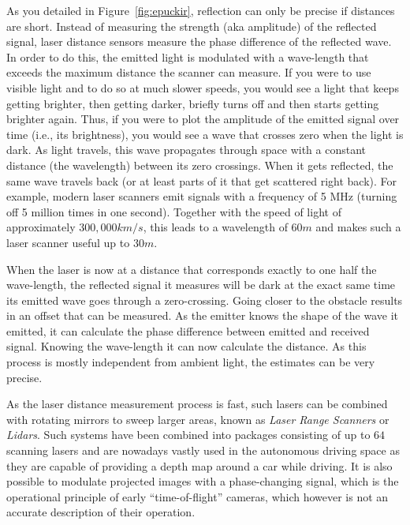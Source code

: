 As you detailed in Figure~\ref{fig:epuckir}, reflection can only be precise if distances are short. Instead of measuring the strength (aka amplitude) of the reflected signal, laser distance sensors measure the phase difference of the reflected wave. In order to do this, the emitted light is modulated with a wave-length that exceeds the maximum distance the scanner can measure.
If you were to use visible light and to do so at much slower speeds, you would see a light that keeps getting brighter, then getting darker, briefly turns off and then starts getting brighter again.
Thus, if you were to plot the amplitude of the emitted signal over time (i.e., its brightness), you would see a wave that crosses zero when the light is dark.
As light travels, this wave propagates through space with a constant distance (the wavelength) between its zero crossings. When it gets reflected, the same wave travels back (or at least parts of it that get scattered right back). For example, modern laser scanners emit signals with a frequency of 5 MHz (turning off 5 million times in one second). Together with the speed of light of approximately $300,000km/s$, this leads to a wavelength of $60m$ and makes such a laser scanner useful up to $30m$.

When the laser is now at a distance that corresponds exactly to one half the wave-length, the reflected signal it measures will be dark at the exact same time its emitted wave goes through a zero-crossing. Going closer to the obstacle results in an offset that can be measured. As the emitter knows the shape of the wave it emitted, it can calculate the phase difference between emitted and received signal. Knowing the wave-length it can now calculate the distance. As this process is mostly independent from ambient light, the estimates can be very precise.

As the laser distance measurement process is fast, such lasers can be combined with rotating mirrors to sweep larger areas, known as \textsl{Laser Range Scanners} or \textsl{Lidars}. Such systems have been combined into packages consisting of up to $64$ scanning lasers and are nowadays vastly used in the autonomous driving space as they are capable of providing a depth map around a car while driving.
It is also possible to modulate projected images with a phase-changing signal, which is the operational principle of early ``time-of-flight'' cameras, which however is not an accurate description of their operation.

